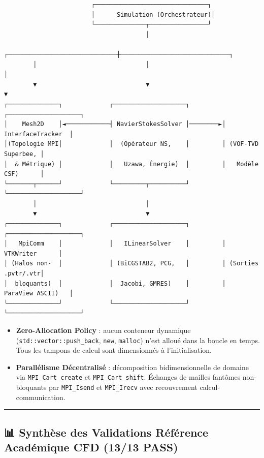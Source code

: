 \documentclass[
  french,
]{article}
\providecommand{\tightlist}{%
  \setlength{\itemsep}{0pt}\setlength{\parskip}{0pt}}
\begin{document}
\begin{verbatim}
                        ┌───────────────────────────────┐
                        │      Simulation (Orchestrateur)│
                        └──────────────┬────────────────┘
                                       │
        ┌──────────────────────────────┼──────────────────────────────┐
        │                              │                              │
        ▼                              ▼                              ▼
┌──────────────┐             ┌────────────────────┐         ┌────────────────────┐
│    Mesh2D    │◄────────────┤ NavierStokesSolver │────────►│  InterfaceTracker  │
│(Topologie MPI│             │  (Opérateur NS,    │         │ (VOF-TVD Superbee, │
│  & Métrique) │             │   Uzawa, Énergie)  │         │   Modèle CSF)      │
└───────┬──────┘             └─────────┬──────────┘         └────────────────────┘
        │                              │
        ▼                              ▼
┌──────────────┐             ┌────────────────────┐         ┌────────────────────┐
│   MpiComm    │             │   ILinearSolver    │         │     VTKWriter      │
│ (Halos non-  │             │ (BiCGSTAB2, PCG,   │         │ (Sorties .pvtr/.vtr│
│  bloquants)  │             │  Jacobi, GMRES)    │         │  ParaView ASCII)   │
└──────────────┘             └────────────────────┘         └────────────────────┘
\end{verbatim}

\begin{itemize}
\tightlist
\item
  \textbf{Zero-Allocation Policy} : aucun conteneur dynamique
  (\texttt{std::vector::push\_back}, \texttt{new}, \texttt{malloc})
  n'est alloué dans la boucle en temps. Tous les tampons de calcul sont
  dimensionnés à l'initialisation.
\item
  \textbf{Parallélisme Décentralisé} : décomposition bidimensionnelle de
  domaine via \texttt{MPI\_Cart\_create} et \texttt{MPI\_Cart\_shift}.
  Échanges de mailles fantômes non-bloquants par \texttt{MPI\_Isend} et
  \texttt{MPI\_Irecv} avec recouvrement calcul-communication.
\end{itemize}

\begin{center}\rule{0.5\linewidth}{0.5pt}\end{center}

\subsection{📊 Synthèse des Validations Référence Académique CFD (13/13
PASS)}\label{synthuxe8se-des-validations-ruxe9fuxe9rence-acaduxe9mique-cfd-1313-pass}
\end{document}
